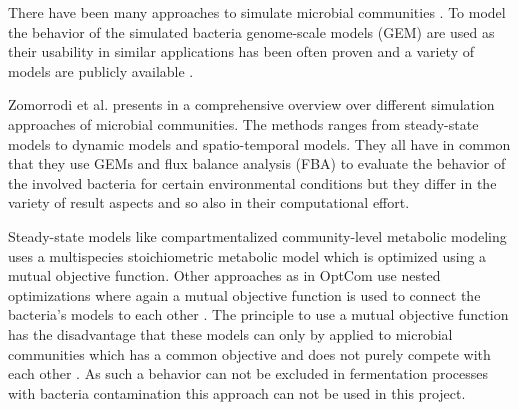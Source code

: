 

There have been many approaches to simulate microbial communities \cite{ZOMORRODI2016837}. To model the behavior of the simulated bacteria
genome-scale models (GEM) are used as their usability in similar applications has been often proven and a variety of models are publicly
available \cite{6915830}.

Zomorrodi et al. presents in \cite{ZOMORRODI2016837} a comprehensive overview over different simulation approaches of microbial communities.
The methods ranges from steady-state models to dynamic models and spatio-temporal models. They all have in common that they use GEMs and
flux balance analysis (FBA) to evaluate the behavior of the involved bacteria for certain environmental conditions but they differ in the
variety of result aspects and so also in their computational effort.

Steady-state models like compartmentalized community-level metabolic modeling uses a multispecies stoichiometric metabolic model
\cite{Stolyar92} which is optimized using a mutual objective function. Other approaches as in OptCom use nested optimizations where again
a mutual objective function is used to connect the bacteria's models to each other \cite{zomorrodi2012optcom}. The principle to use a mutual
objective function has the disadvantage that these models can only by applied to microbial communities which has a common objective and does
not purely compete with each other \cite{ZOMORRODI2016837}. As such a behavior can not be excluded in fermentation processes with bacteria
contamination this approach can not be used in this project.

